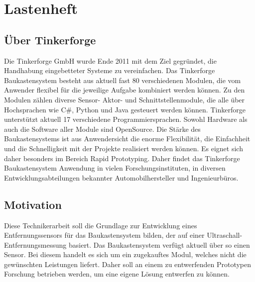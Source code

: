 \section{Lastenheft}
\subsection{Über Tinkerforge}
Die  Tinkerforge  GmbH  wurde  Ende  2011  mit  dem  Ziel  gegründet,  die  Handhabung eingebetteter  Systeme  zu  vereinfachen.  Das  Tinkerforge  Baukastensystem  besteht  aus aktuell fast 80 verschiedenen Modulen, die vom Anwender flexibel für die jeweilige Aufgabe  kombiniert  werden  können.  Zu  den  Modulen  zählen  diverse  Sensor-  Aktor-  und Schnittstellenmodule, die alle über Hochsprachen wie C\#, Python und Java gesteuert werden können. Tinkerforge unterstützt aktuell 17 verschiedene Programmiersprachen. Sowohl Hardware als auch die Software aller Module sind OpenSource. Die Stärke des Baukastensystems  ist  aus  Anwendersicht  die  enorme  Flexibilität,  die  Einfachheit  und
die Schnelligkeit mit der Projekte realisiert werden können. Es eignet sich daher besonders im Bereich Rapid Prototyping. Daher findet das Tinkerforge Baukastensystem Anwendung in vielen Forschungsinstituten, in diversen Entwicklungsabteilungen bekannter Automobilhersteller und Ingenieurbüros.
\subsection{Motivation}
Diese Technikerarbeit soll die Grundlage zur Entwicklung eines Entfernungssensors für das Baukastensystem bilden, der auf einer Ultraschall-Entfernungsmessung basiert. Das Baukastensystem verfügt aktuell über so einen Sensor. Bei diesem handelt es sich um ein zugekauftes Modul, welches nicht die gewünschten Leistungen liefert. Daher soll an einem zu entwerfenden Prototypen Forschung betrieben werden, um eine eigene Lösung entwerfen zu können.
